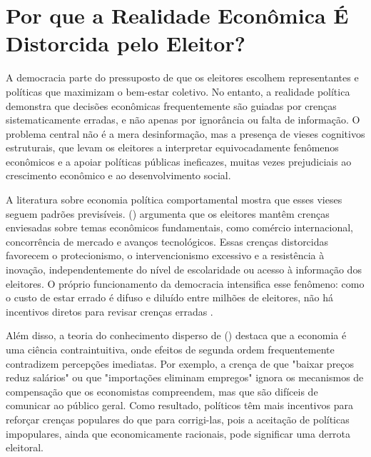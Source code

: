 \section{Por que a Realidade Econômica É Distorcida pelo Eleitor?} %

A democracia parte do pressuposto de que os eleitores escolhem representantes e políticas que maximizam o bem-estar coletivo. No entanto, a realidade política demonstra que decisões econômicas frequentemente são guiadas por crenças sistematicamente erradas, e não apenas por ignorância ou falta de informação. O problema central não é a mera desinformação, mas a presença de vieses cognitivos estruturais, que levam os eleitores a interpretar equivocadamente fenômenos econômicos e a apoiar políticas públicas ineficazes, muitas vezes prejudiciais ao crescimento econômico e ao desenvolvimento social.

A literatura sobre economia política comportamental mostra que esses vieses seguem padrões previsíveis.  (\citeyear{The_Myth_of_the_Rational_Voter}) argumenta que os eleitores mantêm crenças enviesadas sobre temas econômicos fundamentais, como comércio internacional, concorrência de mercado e avanços tecnológicos. Essas crenças distorcidas favorecem o protecionismo, o intervencionismo excessivo e a resistência à inovação, independentemente do nível de escolaridade ou acesso à informação dos eleitores. O próprio funcionamento da democracia intensifica esse fenômeno: como o custo de estar errado é difuso e diluído entre milhões de eleitores, não há incentivos diretos para revisar crenças erradas \cite{downs1957economic}.

Além disso, a teoria do conhecimento disperso de  (\citeyear{hayek_knowledge_use}) destaca que a economia é uma ciência contraintuitiva, onde efeitos de segunda ordem frequentemente contradizem percepções imediatas. Por exemplo, a crença de que "baixar preços reduz salários" ou que "importações eliminam empregos" ignora os mecanismos de compensação que os economistas compreendem, mas que são difíceis de comunicar ao público geral. Como resultado, políticos têm mais incentivos para reforçar crenças populares do que para corrigi-las, pois a aceitação de políticas impopulares, ainda que economicamente racionais, pode significar uma derrota eleitoral.

